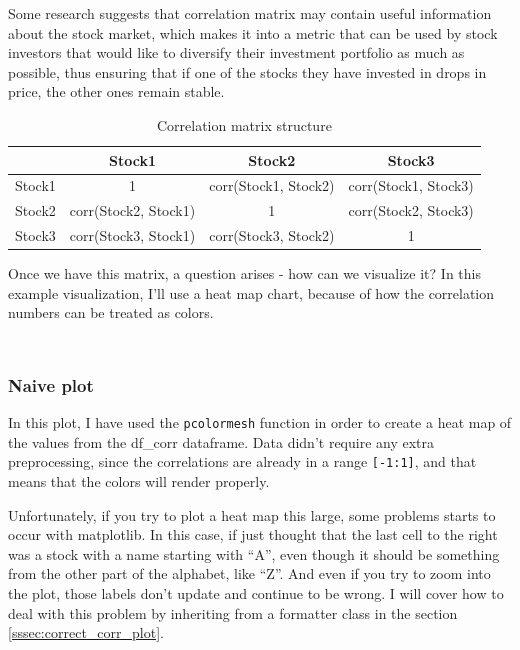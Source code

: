 \documentclass[12pt, a4paper]{article}
\begin{document}
Some research\cite{kwapien2006bulk} suggests that correlation matrix may contain useful information about the stock market, which makes it into a metric that can be used by stock investors that would like to diversify their investment portfolio as much as possible, thus ensuring that if one of the stocks they have invested in drops in price, the other ones remain stable.

\begin{table}[h!]
\centering
\caption{Correlation matrix structure}
\begin{tabular}{ | c | c | c | c | }
  \hline
  \ & Stock1 & Stock2 & Stock3 \\
  \hline
  Stock1 & 1 & corr(Stock1, Stock2) & corr(Stock1, Stock3) \\
  \hline
  Stock2 & corr(Stock2, Stock1) & 1 & corr(Stock2, Stock3) \\
  \hline
  Stock3 & corr(Stock3, Stock1) & corr(Stock3, Stock2) & 1 \\
  \hline
\end{tabular}
\label{table:corr}
\end{table}

Once we have this matrix, a question arises - how can we visualize it? In this example visualization, I'll use a heat map chart, because of how the correlation numbers can be treated as colors.

\bgroup
  \inputminted[linenos, breaklines=true, fontsize=\scriptsize]{python}{src/stocks/corr/0_imports.py}
  \label{listing:scorr_0_imports}
\egroup

\bgroup
  \inputminted[linenos, breaklines=true, fontsize=\scriptsize, firstnumber=last]{python}{src/stocks/corr/1_get_data.py}
  \label{listing:scorr_1}
\egroup

\subsubsection{Naive plot}

In this plot, I have used the \texttt{pcolormesh} function in order to create a heat map of the values from the df\_corr dataframe. Data didn’t require any extra preprocessing, since the correlations are already in a range \texttt{[-1:1]}, and that means that the colors will render properly.

Unfortunately, if you try to plot a heat map this large, some problems starts to occur with matplotlib. In this case, if just thought that the last cell to the right was a stock with a name starting with “A”, even though it should be something from the other part of the alphabet, like “Z”. And even if you try to zoom into the plot, those labels don’t update and continue to be wrong. I will cover how to deal with this problem by inheriting from a formatter class in the section \ref{sssec:correct_corr_plot}.
\end{document}
